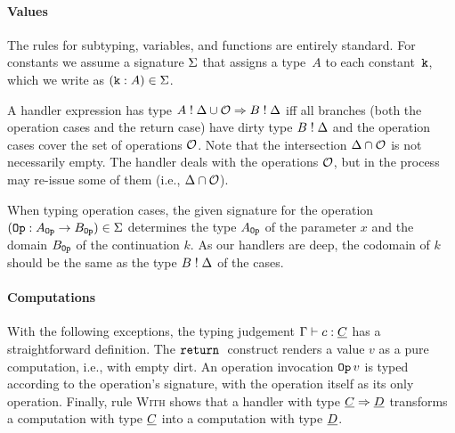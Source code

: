 \paragraph{Values}
The rules for subtyping, variables, and functions are entirely
standard. For constants we assume a signature $\Sigma$ that assigns a type~$A$
to each constant~$\mathtt{k}$, which we write as $(\mathtt{k} \mathrel{:} A) \in \Sigma$.

A handler expression has type $A \mathrel{!} \Delta \cup \mathcal{O} \Rightarrow B \mathrel{!} \Delta$
iff all branches (both the operation cases and the return case) have dirty type $B \mathrel{!} \Delta$
and the operation cases cover the set of operations $\mathcal{O}$. Note that the intersection $\Delta \cap \mathcal{O}$ is not necessarily empty. The handler deals with the operations $\mathcal{O}$, but in the process may re-issue some of them (i.e., $\Delta \cap \mathcal{O}$).

When typing operation cases, the given signature for the operation $(\mathtt{Op} \mathrel{:} A_{\mathtt{Op}} \to B_{\mathtt{Op}}) \in \Sigma$
determines the type $A_{\mathtt{Op}}$ of the parameter $x$ and the domain $B_{\mathtt{Op}}$ of the continuation $k$. As our handlers are deep, the codomain of $k$ should be the same as the type $B \mathrel{!} \Delta$ of the cases.

\paragraph{Computations}
With the following exceptions, the typing judgement $\Gamma \vdash c : \underline{C}$ has a
straightforward definition. The $\mathtt{return}\;$ construct renders a value $v$ as a pure
computation, i.e., with empty dirt. An operation invocation $\mathtt{Op}\,v$ is typed
according to the operation's signature, with the operation itself as its only
operation. Finally,
rule \textsc{With} shows that a handler with type $\underline{C} \Rightarrow \underline{D}$
transforms a computation with type $\underline{C}$ into a computation with type $\underline{D}$.

